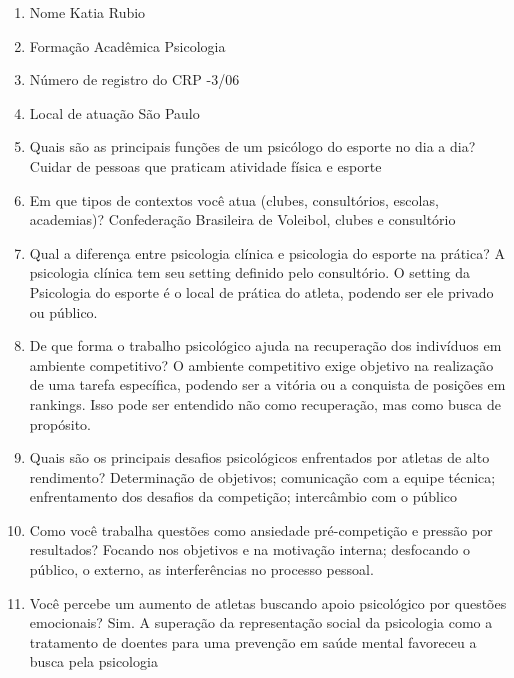 \begin{enumerate}
    \item Nome
        \subitem Katia Rubio
    \item Formação Acadêmica
        \subitem Psicologia
    \item Número de registro do CRP
        -3/06
    \item Local de atuação
        \subitem São Paulo
    \item Quais são as principais funções de um psicólogo do esporte no dia a dia?
        \subitem Cuidar de pessoas que praticam atividade física e esporte
    \item Em que tipos de contextos você atua (clubes, consultórios, escolas, academias)?
        \subitem Confederação Brasileira de Voleibol, clubes e consultório
    \item Qual a diferença entre psicologia clínica e psicologia do esporte na prática?
        \subitem A psicologia clínica tem seu setting definido pelo consultório. O setting da Psicologia do esporte é o local de prática do atleta, podendo ser ele privado ou público.
    \item De que forma o trabalho psicológico ajuda na recuperação dos indivíduos em ambiente competitivo?
        \subitem O ambiente competitivo exige objetivo na realização de uma tarefa específica, podendo ser a vitória ou a conquista de posições em rankings. Isso pode ser entendido não como recuperação, mas como busca de propósito.
    \item Quais são os principais desafios psicológicos enfrentados por atletas de alto rendimento?
        \subitem Determinação de objetivos; comunicação com a equipe técnica; enfrentamento dos desafios da competição; intercâmbio com o público
    \item Como você trabalha questões como ansiedade pré-competição e pressão por resultados?
        \subitem Focando nos objetivos e na motivação interna; desfocando o público, o externo, as interferências no processo pessoal.
    \item Você percebe um aumento de atletas buscando apoio psicológico por questões emocionais?
        \subitem Sim. A superação da representação social da psicologia como a tratamento de doentes para uma prevenção em saúde mental favoreceu a busca pela psicologia

\end{enumerate}
